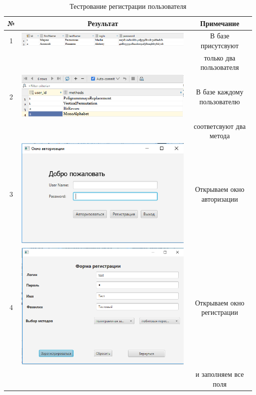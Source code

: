 \documentclass[a4paper,12pt]{article}
\begin{document}
\begin{table}[h]
	\caption{Тестрование регистрации пользователя}
	\centering
	\begin{tabular}{|c|c|c|}
	\hline 
	№  & Результат & Примечание \\ 
	\hline 
	1 & \includegraphics[scale=0.3]{img/database/before_registry_user.png} & В базе присутсвуют \\ && только два пользователя \\
	\hline 
	2 & \includegraphics[scale=0.3]{img/database/before_registry_methods.png} & В базе каждому пользователю \\ && соответсвуют два метода\\
	\hline 
	3 & \includegraphics[scale=0.3]{img/login_form.png} & Открываем окно авторизации\\
	\hline 
	4 & \includegraphics[scale=0.3]{img/database/before_registry_form.png} & Открываем окно регистрации \\ && и заполняем все поля\\

\end{tabular}
\end{table}
\end{document}
